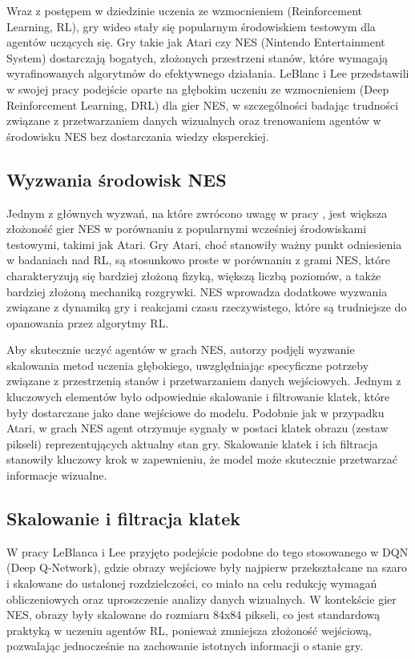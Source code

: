 Wraz z postępem w dziedzinie uczenia ze wzmocnieniem (Reinforcement Learning, RL), gry wideo stały się popularnym środowiskiem testowym dla agentów uczących się. Gry takie jak Atari czy NES (Nintendo Entertainment System) dostarczają bogatych, złożonych przestrzeni stanów, które wymagają wyrafinowanych algorytmów do efektywnego działania. LeBlanc i Lee \cite{NES} przedstawili w swojej pracy podejście oparte na głębokim uczeniu ze wzmocnieniem (Deep Reinforcement Learning, DRL) dla gier NES, w szczególności badając trudności związane z przetwarzaniem danych wizualnych oraz trenowaniem agentów w środowisku NES bez dostarczania wiedzy eksperckiej.

\subsection{Wyzwania środowisk NES}
Jednym z głównych wyzwań, na które zwrócono uwagę w pracy \cite{NES}, jest większa złożoność gier NES w porównaniu z popularnymi wcześniej środowiskami testowymi, takimi jak Atari. Gry Atari, choć stanowiły ważny punkt odniesienia w badaniach nad RL, są stosunkowo proste w porównaniu z grami NES, które charakteryzują się bardziej złożoną fizyką, większą liczbą poziomów, a także bardziej złożoną mechaniką rozgrywki. NES wprowadza dodatkowe wyzwania związane z dynamiką gry i reakcjami czasu rzeczywistego, które są trudniejsze do opanowania przez algorytmy RL.

Aby skutecznie uczyć agentów w grach NES, autorzy podjęli wyzwanie skalowania metod uczenia głębokiego, uwzględniając specyficzne potrzeby związane z przestrzenią stanów i przetwarzaniem danych wejściowych. Jednym z kluczowych elementów było odpowiednie skalowanie i filtrowanie klatek, które były dostarczane jako dane wejściowe do modelu. Podobnie jak w przypadku Atari, w grach NES agent otrzymuje sygnały w postaci klatek obrazu (zestaw pikseli) reprezentujących aktualny stan gry. Skalowanie klatek i ich filtracja stanowiły kluczowy krok w zapewnieniu, że model może skutecznie przetwarzać informacje wizualne.

\subsection{Skalowanie i filtracja klatek}
W pracy LeBlanca i Lee \cite{NES} przyjęto podejście podobne do tego stosowanego w DQN (Deep Q-Network), gdzie obrazy wejściowe były najpierw przekształcane na szaro i skalowane do ustalonej rozdzielczości, co miało na celu redukcję wymagań obliczeniowych oraz uproszczenie analizy danych wizualnych. W kontekście gier NES, obrazy były skalowane do rozmiaru 84x84 pikseli, co jest standardową praktyką w uczeniu agentów RL, ponieważ zmniejsza złożoność wejściową, pozwalając jednocześnie na zachowanie istotnych informacji o stanie gry.


